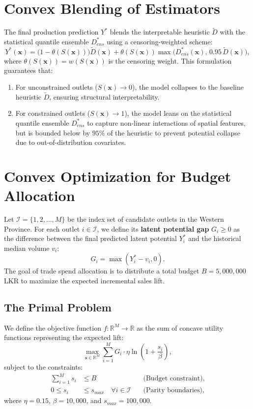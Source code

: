 \documentclass[11pt,a4paper]{article}
\theoremstyle{definition}
\begin{document}
\section{Convex Blending of Estimators}
The final production prediction $Y^*$ blends the interpretable heuristic $\tilde{D}$ with the statistical quantile ensemble $D_{ens}^*$ using a censoring-weighted scheme:
\begin{equation}
    Y^*(\bm{x}) = \Big(1 - \theta(S(\bm{x}))\Big) \tilde{D}(\bm{x}) + \theta(S(\bm{x})) \max\Big(D_{ens}^*(\bm{x}), \, 0.95 \, \tilde{D}(\bm{x})\Big),
\end{equation}
where $\theta(S(\bm{x})) = w(S(\bm{x}))$ is the censoring weight. This formulation guarantees that:
\begin{enumerate}
    \item For unconstrained outlets ($S(\bm{x}) \to 0$), the model collapses to the baseline heuristic $\tilde{D}$, ensuring structural interpretability.
    \item For constrained outlets ($S(\bm{x}) \to 1$), the model leans on the statistical quantile ensemble $D_{ens}^*$ to capture non-linear interactions of spatial features, but is bounded below by $95\%$ of the heuristic to prevent potential collapse due to out-of-distribution covariates.
\end{enumerate}

\section{Convex Optimization for Budget Allocation}
Let $\mathcal{I} = \{1, 2, \dots, M\}$ be the index set of candidate outlets in the Western Province. For each outlet $i \in \mathcal{I}$, we define its \textbf{latent potential gap} $G_i \ge 0$ as the difference between the final predicted latent potential $Y_i^*$ and the historical median volume $v_i$:
\begin{equation}
    G_i = \max(Y_i^* - v_i, 0).
\end{equation}
The goal of trade spend allocation is to distribute a total budget $B = 5,000,000$ LKR to maximize the expected incremental sales lift.

\subsection{The Primal Problem}
We define the objective function $f: \mathbb{R}^M \to \mathbb{R}$ as the sum of concave utility functions representing the expected lift:
\begin{equation}
    \max_{\bm{s} \in \mathbb{R}^M} \sum_{i=1}^M G_i \cdot \eta \ln\left(1 + \frac{s_i}{\beta}\right),
\end{equation}
subject to the constraints:
\begin{align}
    \sum_{i=1}^M s_i &\le B \quad &\text{(Budget constraint)}, \label{eq:budget_cons} \\
    0 \le s_i &\le s_{max} \quad \forall i \in \mathcal{I} \quad &\text{(Parity boundaries)}, \label{eq:spend_cons}
\end{align}
where $\eta = 0.15$, $\beta = 10,000$, and $s_{max} = 100,000$.
\end{document}
